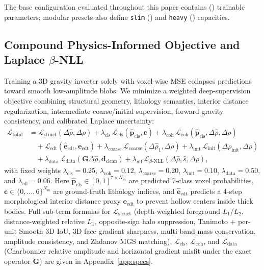 \documentclass[11pt,a4paper]{article}
\begin{document}
The base configuration evaluated throughout this paper contains \valVNineOneParamsExact{} (\valVNineOneParams{}) trainable parameters; modular presets also define \texttt{slim} (\valVNineOneSlimParams{}) and \texttt{heavy} (\valVNineOneHeavyParams{}) capacities.

\subsection{Compound Physics-Informed Objective and Laplace $\beta$-NLL}

Training a 3D gravity inverter solely with voxel-wise MSE collapses predictions toward smooth low-amplitude blobs. We minimize a weighted deep-supervision objective combining structural geometry, lithology semantics, interior distance regularization, intermediate coarse/initial supervision, forward gravity consistency, and calibrated Laplace uncertainty:
\begin{equation}
\begin{aligned}
  \mathcal{L}_{\mathrm{total}} &= \mathcal{L}_{\mathrm{struct}}(\Delta\hat{\rho}, \Delta\rho)
  + \lambda_{\mathrm{cls}}\,\mathcal{L}_{\mathrm{cls}}(\hat{\mathbf{p}}_{\mathrm{cls}}, \mathbf{c})
  + \lambda_{\mathrm{coh}}\,\mathcal{L}_{\mathrm{coh}}(\hat{\mathbf{p}}_{\mathrm{cls}}, \Delta\hat{\rho}, \Delta\rho) \\
  &\quad + \mathcal{L}_{\mathrm{edt}}(\hat{\mathbf{e}}_{\mathrm{edt}}, \mathbf{e}_{\mathrm{edt}})
  + \lambda_{\mathrm{coarse}}\,\mathcal{L}_{\mathrm{coarse}}(\Delta\hat{\rho}_1, \Delta\rho)
  + \lambda_{\mathrm{init}}\,\mathcal{L}_{\mathrm{init}}(\Delta\rho_{\mathrm{init}}, \Delta\rho) \\
  &\quad + \lambda_{\mathrm{data}}\,\mathcal{L}_{\mathrm{data}}(\mathbf{G}\Delta\hat{\rho}, \mathbf{d}_{\mathrm{clean}})
  + \lambda_{\mathrm{nll}}\,\mathcal{L}_{\beta\text{-NLL}}(\Delta\hat{\rho}, \hat{s}, \Delta\rho),
\end{aligned}
  \label{eq:loss_total}
\end{equation}
with fixed weights $\lambda_{\mathrm{cls}}=0.25$, $\lambda_{\mathrm{coh}}=0.12$, $\lambda_{\mathrm{coarse}}=0.20$, $\lambda_{\mathrm{init}}=0.10$, $\lambda_{\mathrm{data}}=0.50$, and $\lambda_{\mathrm{nll}}=0.06$. Here $\hat{\mathbf{p}}_{\mathrm{cls}} \in [0,1]^{7\times N_m}$ are predicted 7-class voxel probabilities, $\mathbf{c} \in \{0,\dots,6\}^{N_m}$ are ground-truth lithology indices, and $\hat{\mathbf{e}}_{\mathrm{edt}}$ predicts a 4-step morphological interior distance proxy $\mathbf{e}_{\mathrm{edt}}$ to prevent hollow centers inside thick bodies. Full sub-term formulas for $\mathcal{L}_{\mathrm{struct}}$ (depth-weighted foreground $L_1$/$L_2$, distance-weighted relative $L_1$, opposite-sign halo suppression, Tanimoto + per-unit Smooth 3D IoU, 3D face-gradient sharpness, multi-band mass conservation, amplitude consistency, and Zhdanov MGS matching), $\mathcal{L}_{\mathrm{cls}}$, $\mathcal{L}_{\mathrm{coh}}$, and $\mathcal{L}_{\mathrm{data}}$ (Charbonnier relative amplitude and horizontal gradient misfit under the exact operator $\mathbf{G}$) are given in Appendix~\ref{app:specs}.
\end{document}
